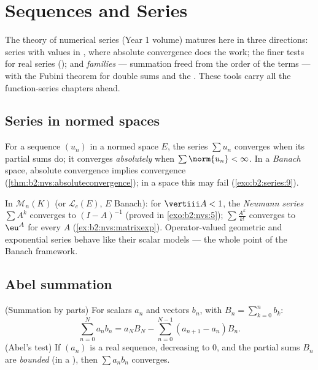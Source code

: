 \chapter{Sequences and Series}\label{ch:b2:series}

The theory of numerical series (Year 1 volume) matures here in three
directions: series with values in , where absolute
convergence does the work; the finer tests for real series (); and \emph{ families} --- summation freed from
the order of the terms --- with the Fubini theorem for double sums
and the . These tools carry all the function-series
chapters ahead.

\section{Series in normed spaces}

\begin{definition}\label{def:b2:series:def}
For a sequence $(u_n)$ in a normed space $E$, the series $\sum u_n$
converges when its partial sums do; it converges
\emph{absolutely} when
$\sum \norm{u_n} < \infty$. In a \emph{Banach} space, absolute
convergence implies convergence (\cref{thm:b2:nvs:absoluteconvergence});
in a  space this may fail
(\cref{exo:b2:series:9}).
\end{definition}

\begin{example}\label{ex:b2:series:neumann}
In $\mathcal{M}_n(K)$ (or $\mathcal{L}_c(E)$, $E$ Banach): for
$\vertiii A < 1$, the \emph{Neumann series} $\sum A^k$ converges
 to $(I - A)^{-1}$ (proved in \cref{exo:b2:nvs:5});
$\sum \frac{A^k}{k!}$ converges  to $\eu^A$ for every $A$
(\cref{ex:b2:nvs:matrixexp}). Operator-valued geometric and
exponential series behave like their scalar models --- the whole
point of the Banach framework.
\end{example}

\section{Abel summation}

\begin{theorem}\label{thm:b2:series:abel}
(Summation by parts) For scalars $a_n$ and vectors $b_n$, with $B_n
= \sum_{k=0}^{n} b_k$:
\[
\sum_{n=0}^{N} a_n b_n
= a_N B_N - \sum_{n=0}^{N-1} (a_{n+1} - a_n) B_n .
\]
(Abel's test) If $(a_n)$ is a real sequence, decreasing to $0$, and
the partial sums $B_n$ are \emph{bounded} (in a ), then
$\sum a_n b_n$ converges.
\end{theorem}

